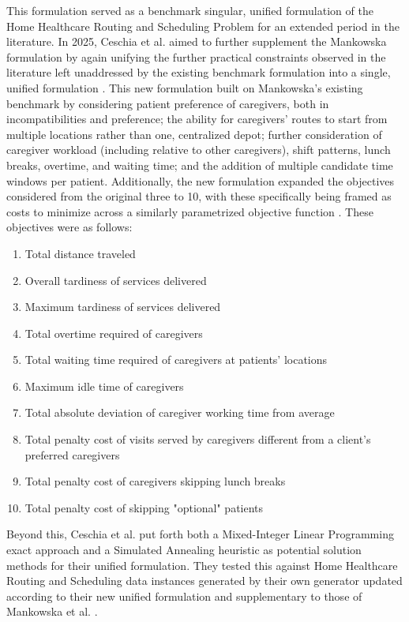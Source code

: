 \documentclass[11pt,twoside]{article}
\numberwithin{Theorem}{section}
\numberwithin{Definition}{section}
\numberwithin{Lemma}{section}
\numberwithin{Algorithm}{section}
\numberwithin{equation}{section}
\begin{document}
This formulation served as a benchmark singular, unified formulation of the Home Healthcare Routing and Scheduling Problem for an extended period in the literature. In 2025, Ceschia et al. aimed to further supplement the Mankowska formulation by again unifying the further practical constraints observed in the literature left unaddressed by the existing benchmark formulation into a single, unified formulation \cite{ceschia25}. This new formulation built on Mankowska's existing benchmark by considering patient preference of caregivers, both in incompatibilities and preference; the ability for caregivers' routes to start from multiple locations rather than one, centralized depot; further consideration of caregiver workload (including relative to other caregivers), shift patterns, lunch breaks, overtime, and waiting time; and the addition of multiple candidate time windows per patient. Additionally, the new formulation expanded the objectives considered from the original three to 10, with these specifically being framed as costs to minimize across a similarly parametrized objective function \cite{ceschia25}. These objectives were as follows:
\begin{enumerate}
	\item Total distance traveled
	\item Overall tardiness of services delivered
	\item Maximum tardiness of services delivered
	\item Total overtime required of caregivers
	\item Total waiting time required of caregivers at patients' locations
	\item Maximum idle time of caregivers
	\item Total absolute deviation of caregiver working time from average
	\item Total penalty cost of visits served by caregivers different from a client's preferred caregivers
	\item Total penalty cost of caregivers skipping lunch breaks
	\item Total penalty cost of skipping "optional" patients
\end{enumerate}

Beyond this, Ceschia et al. put forth both a Mixed-Integer Linear Programming exact approach and a Simulated Annealing heuristic as potential solution methods for their unified formulation. They tested this against Home Healthcare Routing and Scheduling data instances generated by their own generator updated according to their new unified formulation and supplementary to those of Mankowska et al. \cite{ceschia25}. 
\end{document}
